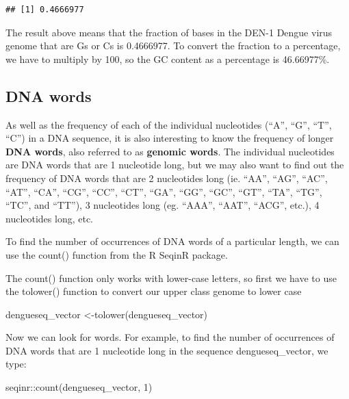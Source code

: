 \documentclass[
]{book}
\newenvironment{Shaded}{\begin{snugshade}}{\end{snugshade}}
\newcommand{\DecValTok}[1]{\textcolor[rgb]{0.00,0.00,0.81}{#1}}
\newcommand{\FunctionTok}[1]{\textcolor[rgb]{0.00,0.00,0.00}{#1}}
\newcommand{\NormalTok}[1]{#1}
\newcommand{\OtherTok}[1]{\textcolor[rgb]{0.56,0.35,0.01}{#1}}
\newcommand{\SpecialCharTok}[1]{\textcolor[rgb]{0.00,0.00,0.00}{#1}}
\begin{document}
\begin{verbatim}
## [1] 0.4666977
\end{verbatim}

The result above means that the fraction of bases in the DEN-1 Dengue virus genome that are Gs or Cs is 0.4666977. To convert the fraction to a percentage, we have to multiply by 100, so the GC content as a percentage is 46.66977\%.

\hypertarget{dna-words}{%
\subsection{DNA words}\label{dna-words}}

As well as the frequency of each of the individual nucleotides (``A'', ``G'', ``T'', ``C'') in a DNA sequence, it is also interesting to know the frequency of longer \textbf{DNA words}, also referred to as \textbf{genomic words}. The individual nucleotides are DNA words that are 1 nucleotide long, but we may also want to find out the frequency of DNA words that are 2 nucleotides long (ie. ``AA'', ``AG'', ``AC'', ``AT'', ``CA'', ``CG'', ``CC'', ``CT'', ``GA'', ``GG'', ``GC'', ``GT'', ``TA'', ``TG'', ``TC'', and ``TT''), 3 nucleotides long (eg. ``AAA'', ``AAT'', ``ACG'', etc.), 4 nucleotides long, etc.

To find the number of occurrences of DNA words of a particular length, we can use the count() function from the R SeqinR package.

The count() function only works with lower-case letters, so first we have to use the tolower() function to convert our upper class genome to lower case

\begin{Shaded}
\begin{Highlighting}[]
\NormalTok{dengueseq\_vector }\OtherTok{\textless{}{-}}\FunctionTok{tolower}\NormalTok{(dengueseq\_vector)}
\end{Highlighting}
\end{Shaded}

Now we can look for words. For example, to find the number of occurrences of DNA words that are 1 nucleotide long in the sequence dengueseq\_vector, we type:

\begin{Shaded}
\begin{Highlighting}[]
\NormalTok{seqinr}\SpecialCharTok{::}\FunctionTok{count}\NormalTok{(dengueseq\_vector, }\DecValTok{1}\NormalTok{)}
\end{Highlighting}
\end{Shaded}
\end{document}
